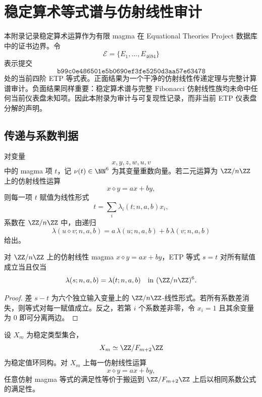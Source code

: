 \documentclass[../../main.tex]{subfiles}
\begin{document}
\section{稳定算术等式谱与仿射线性审计}\label{app:stable-arithmetic-equational-audit}

本附录记录稳定算术运算作为有限 magma 在 Equational Theories Project 数据库中的证书边界。令
\[
    \mathcal E=\{E_1,\ldots,E_{4694}\}
\]
表示提交
\[
    \texttt{b99c0e486501e5b0690ef3fe5250d3aa57e63478}
\]
处的当前四阶 ETP 等式表。正面结果为一个干净的仿射线性传递定理与完整计算谱审计。负面结果同样重要：稳定算术谱与完整 Fibonacci 仿射线性族均未命中任何当前仪表盘未知项。因此本附录为审计与可复现性记录，而非当前 ETP 仪表盘分解的声明。

\subsection{传递与系数判据}

对变量
\[
    x,y,z,w,u,v
\]
中的 magma 项 \(t\)，记 \(\nu(t)\in\NN^6\) 为其变量重数向量。若二元运算为 \(\ZZ/n\ZZ\) 上的仿射线性运算
\[
    x\diamond y=ax+by,
\]
则每一项 \(t\) 赋值为线性形式
\[
    t=\sum_i \lambda_i(t;n,a,b)x_i,
\]
系数在 \(\ZZ/n\ZZ\) 中，由递归
\[
    \lambda(u\diamond v;n,a,b)
       =a\,\lambda(u;n,a,b)+b\,\lambda(v;n,a,b)
\]
给出。

\begin{lemma}[仿射线性系数判据]\label{lem:stable-audit-affine-coefficient-criterion}
对 \(\ZZ/n\ZZ\) 上的仿射线性 magma \(x\diamond y=ax+by\)，ETP 等式 \(s=t\) 对所有赋值成立当且仅当
\[
    \lambda(s;n,a,b)=\lambda(t;n,a,b)
        \quad\text{in }(\ZZ/n\ZZ)^6.
\]
\end{lemma}

\begin{proof}
差 \(s-t\) 为六个独立输入变量上的 \(\ZZ/n\ZZ\)-线性形式。若所有系数差消失，则等式对每一赋值成立。反之，若第 \(i\) 个系数差非零，令 \(x_i=1\) 且其余变量为 \(0\) 即可分离两边。
\end{proof}

\begin{lemma}[稳定值仿射传递]\label{lem:stable-audit-stable-value-affine-transfer}
设 \(X_m\) 为稳定类型集合，
\[
    X_m\simeq \ZZ/F_{m+2}\ZZ
\]
为稳定值环同构。对 \(X_m\) 上每一仿射线性运算
\[
    x\diamond y=ax+by,
\]
任意仿射 magma 等式的满足性等价于搬运到 \(\ZZ/F_{m+2}\ZZ\) 上后以相同系数公式的满足性。
\end{lemma}
\end{document}
